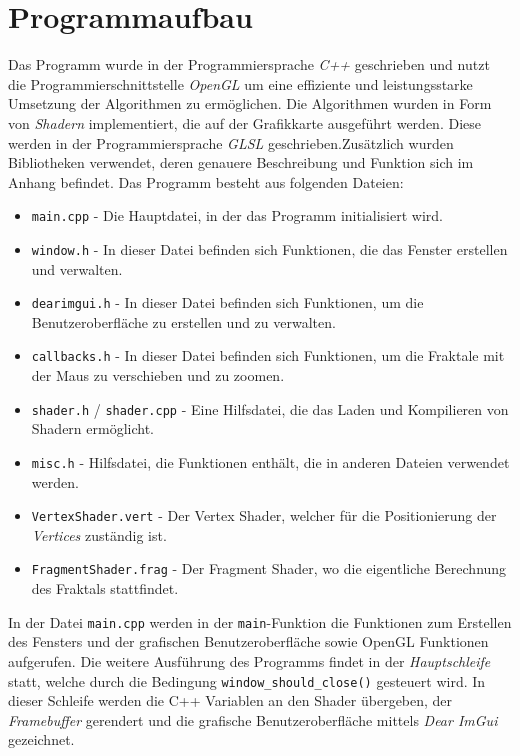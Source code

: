 \section{Programmaufbau}
Das Programm wurde in der Programmiersprache \textit{C++} geschrieben und nutzt
die Programmierschnittstelle \textit{OpenGL} um eine effiziente und
leistungsstarke Umsetzung der Algorithmen zu ermöglichen. Die Algorithmen
wurden in Form von \textit{Shadern} implementiert, die auf der Grafikkarte
ausgeführt werden. Diese werden in der Programmiersprache \textit{GLSL}
geschrieben.\hfill \break \newline \noindent Zusätzlich wurden Bibliotheken
verwendet, deren genauere Beschreibung und Funktion sich im Anhang befindet.
\hfill \break \newline \noindent Das Programm besteht aus folgenden Dateien:
\begin{itemize}
    \item \texttt{main.cpp} - Die Hauptdatei, in der das Programm initialisiert wird.
    \item \texttt{window.h} - In dieser Datei befinden sich Funktionen, die das Fenster erstellen und verwalten.
    \item \texttt{dearimgui.h} - In dieser Datei befinden sich Funktionen, um die Benutzeroberfläche zu erstellen und zu verwalten.
    \item \texttt{callbacks.h} - In dieser Datei befinden sich Funktionen, um die Fraktale mit der Maus zu verschieben und zu zoomen.
    \item \texttt{shader.h} / \texttt{shader.cpp} - Eine Hilfsdatei, die das Laden und Kompilieren von Shadern ermöglicht.
    \item \texttt{misc.h} - Hilfsdatei, die Funktionen enthält, die in anderen Dateien verwendet werden.
    \item \texttt{VertexShader.vert} - Der Vertex Shader, welcher für die Positionierung der \textit{Vertices} zuständig ist.
    \item \texttt{FragmentShader.frag} - Der Fragment Shader, wo die eigentliche Berechnung des Fraktals stattfindet.
\end{itemize}
\noindent
In der Datei \texttt{main.cpp} werden in der \texttt{main}-Funktion die
Funktionen zum Erstellen des Fensters und der grafischen Benutzeroberfläche
sowie OpenGL Funktionen aufgerufen. Die weitere Ausführung des Programms findet
in der \textit{Hauptschleife} statt, welche durch die Bedingung
\texttt{window\_should\_close()} gesteuert wird. In dieser Schleife werden die
C++ Variablen an den Shader übergeben, der \textit{Framebuffer} gerendert und
die grafische Benutzeroberfläche mittels \textit{Dear ImGui} gezeichnet.

